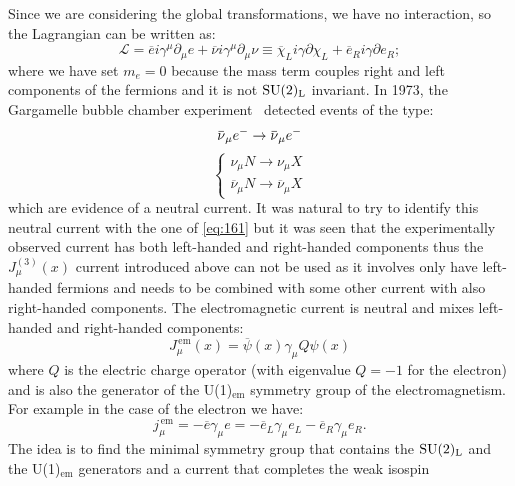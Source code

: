 Since we are considering the global transformations, we have no interaction, so
the Lagrangian can be written as:
\begin{equation}
  \label{eq:2}
  \mathcal{L} = \overbar{e} i \gamma^{\mu} \partial_{\mu} e + \overbar{\nu} i
  \gamma^{\mu} \partial_{\mu} \nu \equiv \overbar{\chi}_{L} i
  \gamma \partial \chi_{L} + \overbar{e}_{R} i \gamma \partial e_{R};
\end{equation}
where we have set $m_{e} = 0$ because the mass term couples right and left
components of the fermions and it is not $\mathrm{SU}(2)_\mathrm{L}$ invariant. In 1973, the
Gargamelle bubble chamber experiment~\cite{Gargamelle} detected events of the
type:
\begin{equation}
  \label{eq:3}
  \overbar{\nu}_{\mu}\eminus \rightarrow \overbar{\nu}_{\mu}\eminus \\
\end{equation}
\begin{equation}
  \label{eq:4}
  \begin{cases}
    \nu_{\mu} N \rightarrow \nu_{\mu} X \\
    \overbar{\nu}_{\mu} N \rightarrow \overbar{\nu}_{\mu} X
  \end{cases}
\end{equation}
which are evidence of a neutral current. It was natural to try to identify this
neutral current with the one of \cref{eq:161} but it was seen that the
experimentally observed current has both left-handed and right-handed components
thus the $J^{(3)}_{\mu}(x)$ current introduced above can not be used as it
involves only have left-handed fermions and needs to be combined with some other
current with also right-handed components. The electromagnetic current is
neutral and mixes left-handed and right-handed components:
\begin{equation}
  \label{eq:5}
  J_{\mu}^\mathrm{\, em} (x) = \overbar{\psi}(x) \gamma_{\mu} Q \psi (x)
\end{equation}
where $Q$ is the electric charge operator (with eigenvalue $Q = -1$ for the
electron) and is also the generator of the U(1)$_\mathrm{em}$ symmetry group of
the electromagnetism. For example in the case of the electron we have:
\begin{equation}
  \label{eq:162}
  j_\mu^\mathrm{\, em} = - \overbar{e} \gamma_\mu e = - \overbar{e}_L \gamma_\mu
  e_L - \overbar{e}_R \gamma_\mu e_R.
\end{equation}
The idea is to find the minimal symmetry group that contains the $\mathrm{SU}(2)_\mathrm{L}$ and
the U(1)$_\mathrm{em}$ generators and a current that completes the weak isospin
